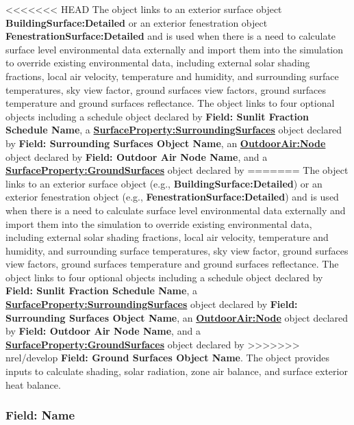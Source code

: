 <<<<<<< HEAD
The object links to an exterior surface object \textbf{BuildingSurface:Detailed} or an exterior fenestration object \textbf{FenestrationSurface:Detailed} and is used when there is a need to calculate surface level environmental data externally and import them into the simulation to override existing environmental data, including external solar shading fractions, local air velocity, temperature and humidity, and surrounding surface temperatures, sky view factor, ground surfaces view factors, ground surfaces temperature and ground surfaces reflectance. The object links to four optional objects including a schedule object declared by \textbf{Field: Sunlit Fraction Schedule Name}, a \textbf{\hyperref[surfacePropertySurroundingSurfaces]{SurfaceProperty:SurroundingSurfaces}} object declared by \textbf{Field: Surrounding Surfaces Object Name}, an \textbf{\hyperref[outdoorairnode]{OutdoorAir:Node}} object declared by \textbf{Field: Outdoor Air Node Name}, and a \textbf{\hyperref[surfacePropertyGroundSurfaces]{SurfaceProperty:GroundSurfaces}} object declared by
=======
The object links to an exterior surface object (e.g., \textbf{BuildingSurface:Detailed}) or an exterior fenestration object (e.g., \textbf{FenestrationSurface:Detailed}) and is used when there is a need to calculate surface level environmental data externally and import them into the simulation to override existing environmental data, including external solar shading fractions, local air velocity, temperature and humidity, and surrounding surface temperatures, sky view factor, ground surfaces view factors, ground surfaces temperature and ground surfaces reflectance. The object links to four optional objects including a schedule object declared by \textbf{Field: Sunlit Fraction Schedule Name}, a \textbf{\hyperref[surfacePropertySurroundingSurfaces]{SurfaceProperty:SurroundingSurfaces}} object declared by \textbf{Field: Surrounding Surfaces Object Name}, an \textbf{\hyperref[outdoorairnode]{OutdoorAir:Node}} object declared by \textbf{Field: Outdoor Air Node Name}, and a \textbf{\hyperref[surfacePropertyGroundSurfaces]{SurfaceProperty:GroundSurfaces}} object declared by
>>>>>>> nrel/develop
\textbf{Field: Ground Surfaces Object Name}. The object provides inputs to calculate shading, solar radiation, zone air balance, and surface exterior heat balance.

\subsubsection{Field: Name}\label{field-surf-localenv-name}

